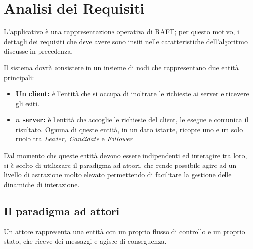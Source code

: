\section{Analisi dei Requisiti} \label{Actors}
L'applicativo è una rappresentazione operativa di RAFT; per questo motivo, i dettagli dei requisiti che deve avere sono insiti nelle caratteristiche dell'algoritmo discusse in precedenza. 

Il sistema dovrà consistere in un insieme di nodi che rappresentano due entità principali:
	\begin{itemize}
		\item \textbf{Un client:} è l'entità che si occupa di inoltrare le richieste ai server e ricevere gli esiti.
		\item \textbf{$n$ server:} è l'entità che accoglie le richieste del client, le esegue e comunica il risultato. Ognuna di queste entità, in un dato istante, ricopre uno e un solo ruolo tra \textit{Leader, Candidate} e \textit{Follower}
	\end{itemize}

Dal momento che queste entità devono essere indipendenti ed interagire tra loro, si è scelto di utilizzare il paradigma ad attori, che rende possibile agire ad un livello di astrazione molto elevato permettendo di facilitare la gestione delle dinamiche di interazione.


	\subsection{Il paradigma ad attori}
	Un attore rappresenta una entità con un proprio flusso di controllo e un proprio stato, che riceve dei messaggi e agisce di conseguenza. 